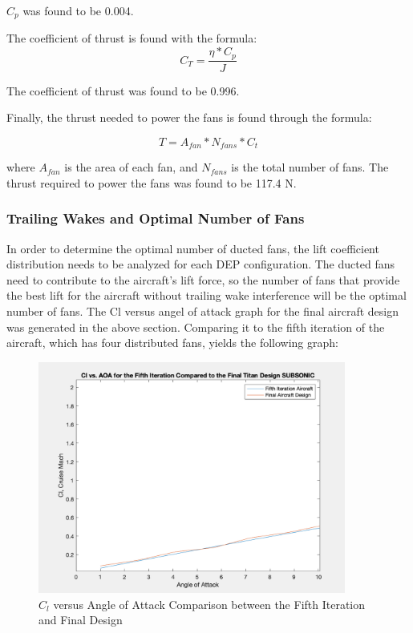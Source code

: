 \documentclass{article}
\begin{document}
${C_{p}}$ was found to be 0.004. 

The coefficient of thrust is found with the formula: 
\begin{equation}
C_{T} = \frac{\eta* C_{p}}{J}
\end{equation}

The coefficient of thrust was found to be 0.996.

Finally, the thrust needed to power the fans is found through the formula: 

\begin{equation}
T = A_{fan}*N_{fans} * C_{t}
\end{equation}

where ${A_{fan}}$ is the area of each fan, and ${N_{fans}}$ is the total number of fans. The thrust required to power the fans was found to be 117.4 N. 


\subsubsection{Trailing Wakes and Optimal Number of Fans}

In order to determine the optimal number of ducted fans, the lift coefficient distribution needs to be analyzed for each DEP configuration. The ducted fans need to contribute to the aircraft's lift force, so the number of fans that provide the best lift for the aircraft without trailing wake interference will be the optimal number of fans. The Cl versus angel of attack graph for the final aircraft design was generated in the above section. Comparing it to the fifth iteration of the aircraft, which has four distributed fans, yields the following graph: 

\begin{figure}[H]
    \centering
    \includegraphics[width = 0.90\textwidth]{Figures/OptimalProp.png}
    \caption{${C_{l}}$ versus Angle of Attack Comparison between the Fifth Iteration and Final Design}
    \label{fig:OptimalProp}
\end{figure}
\end{document}
